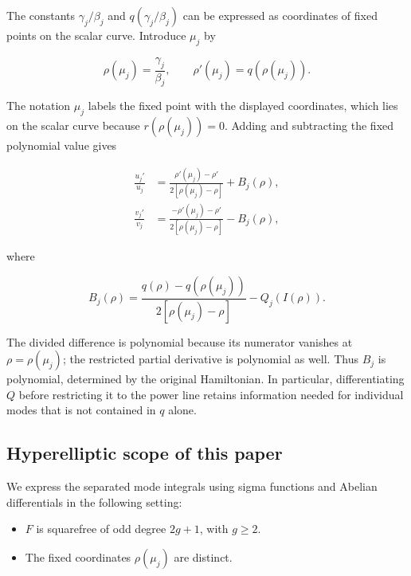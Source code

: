\documentclass[11pt]{article}
\begin{document}
The constants $\gamma_j/\beta_j$ and $q(\gamma_j/\beta_j)$ can be expressed as coordinates of fixed points on the scalar curve. Introduce $\mu_j$ by

\begin{equation}\label{eq:mode-points}
\rho(\mu_j)=\frac{\gamma_j}{\beta_j},\qquad
\rho'(\mu_j)=q(\rho(\mu_j)).
\end{equation}

The notation $\mu_j$ labels the fixed point with the displayed coordinates, which lies on the scalar curve because $r(\rho(\mu_j))=0$. Adding and subtracting the fixed polynomial value gives

\begin{equation}\label{eq:split-log}
\begin{aligned}
\frac{u_j'}{u_j}
&=\frac{\rho'(\mu_j)-\rho'}{2[\rho(\mu_j)-\rho]}+B_j(\rho),\\
\frac{v_j'}{v_j}
&=\frac{-\rho'(\mu_j)-\rho'}{2[\rho(\mu_j)-\rho]}-B_j(\rho),
\end{aligned}
\end{equation}

where

\begin{equation}\label{eq:B-def}
B_j(\rho)=
\frac{q(\rho)-q(\rho(\mu_j))}{2[\rho(\mu_j)-\rho]}
-Q_j(I(\rho)).
\end{equation}

The divided difference is polynomial because its numerator vanishes at $\rho=\rho(\mu_j)$; the restricted partial derivative is polynomial as well. Thus $B_j$ is polynomial, determined by the original Hamiltonian. In particular, differentiating $Q$ before restricting it to the power line retains information needed for individual modes that is not contained in $q$ alone.

\subsection{Hyperelliptic scope of this paper}

We express the separated mode integrals using sigma functions and Abelian differentials in the following setting:

\begin{itemize}
\item $F$ is squarefree of odd degree $2g+1$, with $g\ge2$.
\item The fixed coordinates $\rho(\mu_j)$ are distinct.
\end{itemize}
\end{document}
